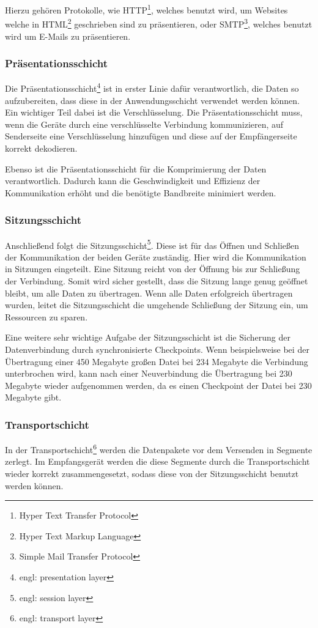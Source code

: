 \documentclass[12pt]{article}
\begin{document}
	Hierzu gehören Protokolle, wie HTTP\footnote{Hyper Text Transfer Protocol}, welches benutzt wird, um Websites welche in HTML\footnote{Hyper Text Markup Language} geschrieben sind zu präsentieren, oder SMTP\footnote{Simple Mail Transfer Protocol}, welches benutzt wird um E-Mails zu präsentieren.

\subsubsection{Präsentationsschicht}
	Die Präsentationsschicht\footnote{engl: presentation layer} ist in erster Linie dafür verantwortlich, die Daten so aufzubereiten, dass diese in der Anwendungsschicht verwendet werden können. Ein wichtiger Teil dabei ist die Verschlüsselung. Die Präsentationsschicht muss, wenn die Geräte durch eine verschlüsselte Verbindung kommunizieren, auf Senderseite eine Verschlüsselung hinzufügen und diese auf der Empfängerseite korrekt dekodieren. 
	
	Ebenso ist die Präsentationsschicht für die Komprimierung der Daten verantwortlich. Dadurch kann die Geschwindigkeit und Effizienz der Kommunikation erhöht und die benötigte Bandbreite minimiert werden.

\subsubsection{Sitzungsschicht}
	Anschließend folgt die Sitzungsschicht\footnote{engl: session layer}. Diese ist für das Öffnen und Schließen der Kommunikation der beiden Geräte zuständig. Hier wird die Kommunikation in Sitzungen eingeteilt. Eine Sitzung reicht von der Öffnung bis zur Schließung der Verbindung. Somit wird sicher gestellt, dass die Sitzung lange genug geöffnet bleibt, um alle Daten zu übertragen. Wenn alle Daten erfolgreich übertragen wurden, leitet die Sitzungsschicht die umgehende Schließung der Sitzung ein, um Ressourcen zu sparen. 
	
	Eine weitere sehr wichtige Aufgabe der Sitzungsschicht ist die Sicherung der Datenverbindung durch synchronisierte Checkpoints. Wenn beispielsweise bei der Übertragung einer 450 Megabyte großen Datei bei 234 Megabyte die Verbindung unterbrochen wird, kann nach einer Neuverbindung die Übertragung bei 230 Megabyte wieder aufgenommen werden, da es einen Checkpoint der Datei bei 230 Megabyte gibt.

\subsubsection{Transportschicht}
	In der Transportschicht\footnote{engl: transport layer} werden die Datenpakete vor dem Versenden in Segmente zerlegt. Im Empfangsgerät werden die diese Segmente durch die Transportschicht wieder korrekt zusammengesetzt, sodass diese von der Sitzungsschicht benutzt werden können. 
	
\end{document}
